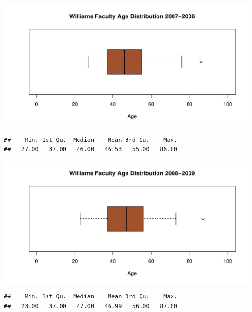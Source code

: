 \documentclass[12pt,a4paper]{article}\usepackage[]{graphicx}\usepackage[]{color}
\makeatletter
\def\maxwidth{ %
  \ifdim\Gin@nat@width>\linewidth
    \linewidth
  \else
    \Gin@nat@width
  \fi
}
\newenvironment{kframe}{%
 \def\at@end@of@kframe{}%
 \ifinner\ifhmode%
  \def\at@end@of@kframe{\end{minipage}}%
  \begin{minipage}{\columnwidth}%
 \fi\fi%
 \def\FrameCommand##1{\hskip\@totalleftmargin \hskip-\fboxsep
 \colorbox{shadecolor}{##1}\hskip-\fboxsep
     \hskip-\linewidth \hskip-\@totalleftmargin \hskip\columnwidth}%
 \MakeFramed {\advance\hsize-\width
   \@totalleftmargin\z@ \linewidth\hsize
   \@setminipage}}%
 {\par\unskip\endMakeFramed%
 \at@end@of@kframe}
\newenvironment{knitrout}{}{} %
\theoremstyle{definition}
\makeatother
\begin{document}
\begin{knitrout}
\color{fgcolor}
\includegraphics[width=\maxwidth]{figure/unnamed-chunk-20-1} 

\end{knitrout}

\begin{knitrout}
\color{fgcolor}\begin{kframe}
\begin{verbatim}
##    Min. 1st Qu.  Median    Mean 3rd Qu.    Max. 
##   27.00   37.00   46.00   46.53   55.00   86.00
\end{verbatim}
\end{kframe}
\end{knitrout}


\begin{knitrout}
\color{fgcolor}
\includegraphics[width=\maxwidth]{figure/unnamed-chunk-22-1} 

\end{knitrout}

\begin{knitrout}
\color{fgcolor}\begin{kframe}
\begin{verbatim}
##    Min. 1st Qu.  Median    Mean 3rd Qu.    Max. 
##   23.00   37.00   47.00   46.99   56.00   87.00
\end{verbatim}
\end{kframe}
\end{knitrout}
\end{document}

